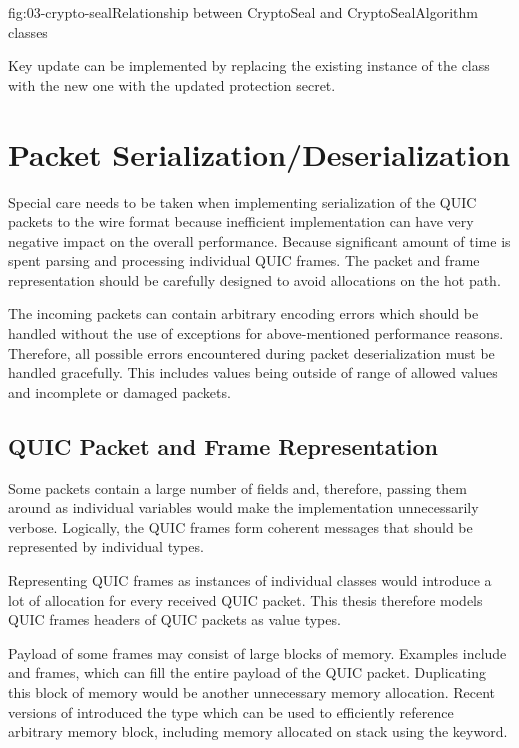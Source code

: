 \begin{myFigure}{fig:03-crypto-seal}{Relationship between CryptoSeal and CryptoSealAlgorithm classes}

  \resizebox{\linewidth}{!}{}

\end{myFigure}

Key update can be implemented by replacing the existing instance of the
\CryptoSeal{} class with the new one with the updated protection secret.

\section{Packet Serialization/Deserialization}

Special care needs to be taken when implementing serialization of the QUIC packets to the wire
format because inefficient implementation can have very negative impact on the overall performance.
Because significant amount of time is spent parsing and processing individual QUIC frames. The
packet and frame representation should be carefully designed to avoid allocations on the hot path.

The incoming packets can contain arbitrary encoding errors which should be handled without the use
of exceptions for above-mentioned performance reasons. Therefore, all possible errors encountered
during packet deserialization must be handled gracefully. This includes values being outside of
range of allowed values and incomplete or damaged packets.

\subsection{QUIC Packet and Frame Representation}

Some packets contain a large number of fields and, therefore, passing them around as individual
variables would make the implementation unnecessarily verbose. Logically, the QUIC frames form
coherent messages that should be represented by individual \dotnet{} types.

Representing QUIC frames as instances of individual classes would introduce a lot of allocation for
every received QUIC packet. This thesis therefore models QUIC frames headers of QUIC packets as value types.

Payload of some frames may consist of large blocks of memory. Examples include \STREAM{} and
\CRYPTO{} frames, which can fill the entire payload of the QUIC packet. Duplicating this block of
memory would be another unnecessary memory allocation. Recent versions of \dotnet{}  introduced the  type which can be used to efficiently reference arbitrary
memory block, including memory allocated on stack using the  keyword.

